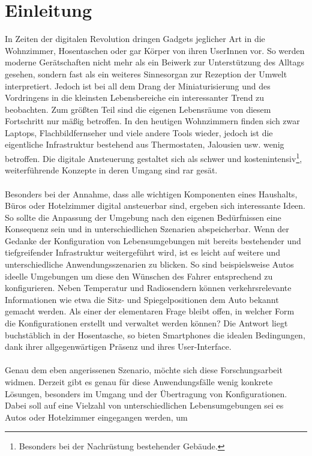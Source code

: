 \chapter{Einleitung}

In Zeiten der digitalen Revolution dringen Gadgets jeglicher Art in die Wohnzimmer, Hosentaschen oder gar Körper von ihren UserInnen vor. So werden moderne Gerätschaften 
nicht mehr als ein Beiwerk zur Unterstützung des Alltags gesehen, sondern fast als ein weiteres Sinnesorgan zur Rezeption der Umwelt interpretiert. 
Jedoch ist bei all dem Drang der Miniaturisierung und des Vordringens in die kleinsten Lebensbereiche ein interessanter Trend zu beobachten. 
Zum größten Teil sind die eigenen Lebensräume von diesem Fortschritt nur mäßig betroffen. In den heutigen Wohnzimmern finden sich zwar Laptops, Flachbildfernseher und viele andere Tools wieder, jedoch ist die eigentliche Infrastruktur bestehend aus Thermostaten, Jalousien usw. wenig betroffen. Die digitale Ansteuerung gestaltet sich als schwer und
kostenintensiv\footnote{Besonders bei der Nachrüstung bestehender Gebäude.}, weiterführende  Konzepte in deren Umgang sind rar gesät. 
\\\\
Besonders bei der Annahme, dass alle 
wichtigen Komponenten eines Haushalts, Büros oder Hotelzimmer digital ansteuerbar sind, ergeben sich interessante Ideen. So sollte die Anpassung der Umgebung nach den eigenen
Bedürfnissen eine Konsequenz sein und in unterschiedlichen Szenarien abspeicherbar. 
Wenn der Gedanke der Konfiguration von Lebensumgebungen mit bereits bestehender und tiefgreifender Infrastruktur weitergeführt wird, ist es leicht auf weitere und 
unterschiedliche Anwendungsszenarien zu blicken. 
So sind beispielsweise Autos ideelle Umgebungen um diese den Wünschen des Fahrer entsprechend zu konfigurieren. Neben Temperatur und Radiosendern können verkehrsrelevante 
Informationen wie etwa die Sitz- und Spiegelpositionen dem Auto bekannt gemacht werden. Als einer der elementaren Frage bleibt offen, in welcher Form die Konfigurationen 
erstellt und verwaltet werden können? Die Antwort liegt buchstäblich in der Hosentasche, so bieten Smartphones die idealen Bedingungen, dank ihrer allgegenwärtigen Präsenz 
und ihres User-Interface.
\\\\
Genau dem eben angerissenen Szenario, möchte sich diese Forschungsarbeit widmen. Derzeit gibt es genau für diese Anwendungsfälle wenig konkrete Lösungen, besonders im 
Umgang und der Übertragung von Konfigurationen. Dabei soll auf eine Vielzahl von unterschiedlichen Lebensumgebungen sei es Autos oder Hotelzimmer eingegangen werden, um 

